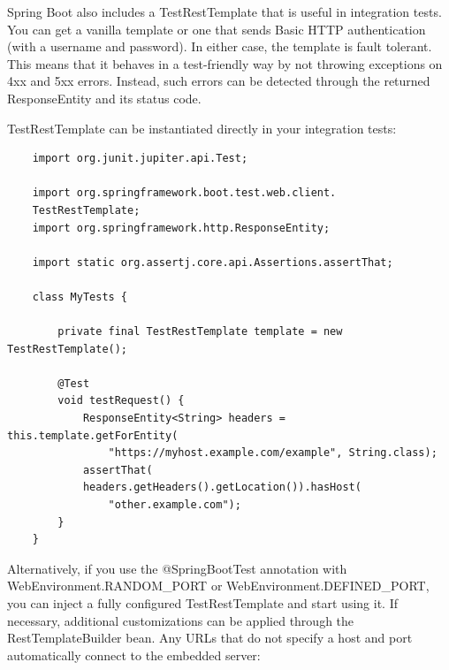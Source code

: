 \documentclass{scrartcl}
\begin{document}
Spring Boot also includes a TestRestTemplate that is useful in integration tests. You can get a vanilla template or one that sends Basic HTTP authentication (with a username and password). In either case, the template is fault tolerant. This means that it behaves in a test-friendly way by not throwing exceptions on 4xx and 5xx errors. Instead, such errors can be detected through the returned ResponseEntity and its status code.

TestRestTemplate can be instantiated directly in your integration tests:

\begin{lstlisting}
    import org.junit.jupiter.api.Test;

    import org.springframework.boot.test.web.client.
    TestRestTemplate;
    import org.springframework.http.ResponseEntity;

    import static org.assertj.core.api.Assertions.assertThat;

    class MyTests {

        private final TestRestTemplate template = new TestRestTemplate();

        @Test
        void testRequest() {
            ResponseEntity<String> headers = this.template.getForEntity(
                "https://myhost.example.com/example", String.class);
            assertThat(
            headers.getHeaders().getLocation()).hasHost(
                "other.example.com");
        }
    }
\end{lstlisting}

Alternatively, if you use the @SpringBootTest annotation with WebEnvironment.RANDOM\_PORT or WebEnvironment.DEFINED\_PORT, you can inject a fully configured TestRestTemplate and start using it. If necessary, additional customizations can be applied through the RestTemplateBuilder bean. Any URLs that do not specify a host and port automatically connect to the embedded server:
\end{document}
